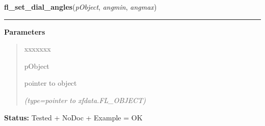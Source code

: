     \label{xformslib:library:fl_set_dial_angles}

    \vspace{0.5ex}

\hspace{.8\funcindent}\begin{boxedminipage}{\funcwidth}

    \raggedright \textbf{fl\_set\_dial\_angles}(\textit{pObject}, \textit{angmin}, \textit{angmax})

    \vspace{-1.5ex}

    \rule{\textwidth}{0.5\fboxrule}
\setlength{\parskip}{2ex}
\setlength{\parskip}{1ex}
      \textbf{Parameters}
      \vspace{-1ex}

      \begin{quote}
        \begin{Ventry}{xxxxxxx}

          \item[pObject]

          pointer to object

            {\it (type=pointer to xfdata.FL\_OBJECT)}

        \end{Ventry}

      \end{quote}

\textbf{Status:} Tested + NoDoc + Example = OK



    \end{boxedminipage}

    \label{xformslib:library:fl_set_dial_cross}

    \vspace{0.5ex}

